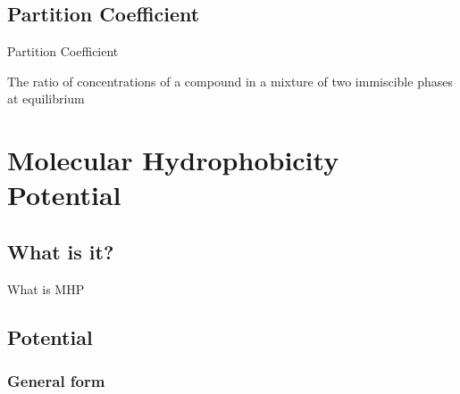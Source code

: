 \documentclass{beamer}
\begin{document}
\subsection{Partition Coefficient}
\begin{frame}{Partition Coefficient}
	\centering
	\begin{tcolorbox}[colback=blue!5, colframe=blue!40!black, title=Definition]
		The ratio of concentrations of a compound in a mixture of two immiscible phases at equilibrium
	\end{tcolorbox}
	\begin{itemize}
        \setlength\itemsep{1.5em}
	\end{itemize}
\end{frame}

\section{Molecular Hydrophobicity Potential}
\subsection{What is it?}
\begin{frame}{What is MHP}
\end{frame}

\subsection{Potential}
\subsubsection{General form}
\end{document}
